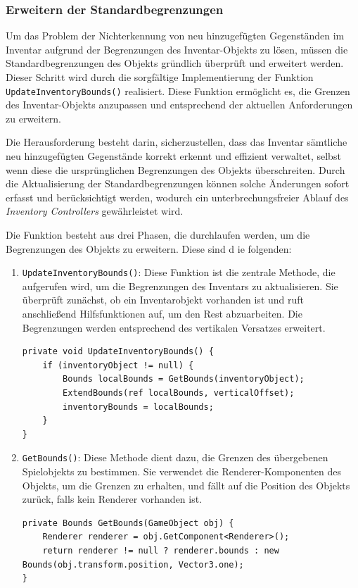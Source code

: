 \begin{itemize}
\subsubsection{Erweitern der Standardbegrenzungen}
Um das Problem der Nichterkennung von neu hinzugefügten Gegenständen im Inventar aufgrund der Begrenzungen des Inventar-Objekts
zu lösen, müssen die Standardbegrenzungen des Objekts gründlich überprüft und erweitert werden. Dieser Schritt wird
durch die sorgfältige Implementierung der Funktion \texttt{UpdateInventoryBounds()} realisiert. Diese Funktion ermöglicht
es, die Grenzen des Inventar-Objekts anzupassen und entsprechend der aktuellen Anforderungen zu erweitern.

Die Herausforderung besteht darin, sicherzustellen, dass das Inventar sämtliche neu hinzugefügten Gegenstände korrekt
erkennt und effizient verwaltet, selbst wenn diese die ursprünglichen Begrenzungen des Objekts überschreiten. Durch die
Aktualisierung der Standardbegrenzungen können solche Änderungen sofort erfasst und berücksichtigt werden, wodurch ein
unterbrechungsfreier Ablauf des \textit{Inventory Controllers} gewährleistet wird.

Die Funktion besteht aus drei Phasen, die durchlaufen werden, um die Begrenzungen des Objekts zu erweitern. Diese sind d
ie folgenden:

\begin{enumerate}
\item \texttt{UpdateInventoryBounds()}: Diese Funktion ist die zentrale Methode, die aufgerufen wird, um die Begrenzungen
des Inventars zu aktualisieren. Sie überprüft zunächst, ob ein Inventarobjekt vorhanden ist und ruft anschließend
Hilfsfunktionen auf, um den Rest abzuarbeiten. Die Begrenzungen werden entsprechend des vertikalen Versatzes erweitert.
\begin{lstlisting}[language={[Sharp]C}]
private void UpdateInventoryBounds() {
    if (inventoryObject != null) {
        Bounds localBounds = GetBounds(inventoryObject);
        ExtendBounds(ref localBounds, verticalOffset);
        inventoryBounds = localBounds;
    }
}
\end{lstlisting}

\item \texttt{GetBounds()}: Diese Methode dient dazu, die Grenzen des übergebenen Spielobjekts zu bestimmen. Sie verwendet
die Renderer-Komponenten des Objekts, um die Grenzen zu erhalten, und fällt auf die Position des Objekts zurück, falls
kein Renderer vorhanden ist.
\begin{lstlisting}[language={[Sharp]C}]
private Bounds GetBounds(GameObject obj) {
    Renderer renderer = obj.GetComponent<Renderer>();
    return renderer != null ? renderer.bounds : new Bounds(obj.transform.position, Vector3.one);
}
\end{lstlisting}


\end{enumerate}
\end{itemize}
